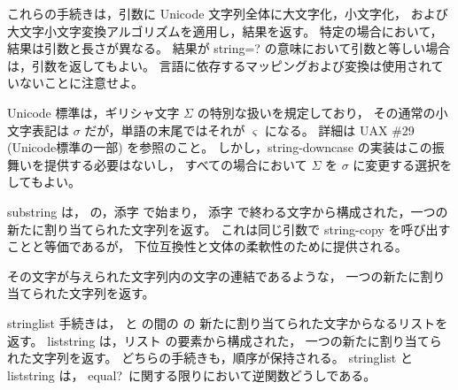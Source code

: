 \begin{entry}{%
}


これらの手続きは，引数に Unicode 文字列全体に大文字化，小文字化，
および大文字小文字変換アルゴリズムを適用し，結果を返す。
特定の場合において，結果は引数と長さが異なる。
結果が {\cf string=?} の意味において引数と等しい場合は，引数を返してもよい。
言語に依存するマッピングおよび変換は使用されていないことに注意せよ。

Unicode 標準は，ギリシャ文字 $\Sigma$ の特別な扱いを規定しており，
その通常の小文字表記は $\sigma$ だが，単語の末尾ではそれが $\varsigma$ になる。
詳細は UAX \#29~\cite{uax29} (Unicode標準の一部) を参照のこと。
しかし，{\cf string-downcase} の実装はこの振舞いを提供する必要はないし，
すべての場合において $\Sigma$ を $\sigma$ に変更する選択をしてもよい。

\end{entry}


\begin{entry}{%
}

{\cf substring} は， の，添字  で始まり，
添字  で終わる文字から構成された，一つの新たに割り当てられた文字列を返す。
これは同じ引数で {\cf string-copy} を呼び出すことと等価であるが，
下位互換性と文体の柔軟性のために提供される。
\end{entry}


\begin{entry}{%
}

その文字が与えられた文字列内の文字の連結であるような，
一つの新たに割り当てられた文字列を返す。

\end{entry}


\begin{entry}{%
}

{\cf string\coerce{}list} 手続きは， と  の間の  の
新たに割り当てられた文字からなるリストを返す。
{\cf list\coerce{}string} は，リスト  の要素から構成された，
一つの新たに割り当てられた文字列を返す。
どちらの手続きも，順序が保持される。
{\cf string\coerce{}list} と {\cf list\coerce{}string} は，
{\cf equal?}\ に関する限りにおいて逆関数どうしである。

\end{entry}


